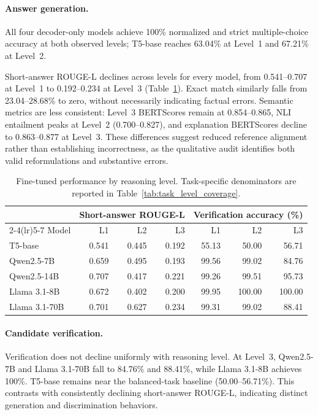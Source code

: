 \documentclass[a4paper,fleqn]{cas-sc}
\begin{document}
\paragraph{Answer generation.}
All four decoder-only models achieve 100\% normalized and strict multiple-choice accuracy at both observed levels; T5-base reaches 63.04\% at Level~1 and 67.21\% at Level~2.

Short-answer ROUGE-L declines across levels for every model, from 0.541--0.707 at Level~1 to 0.192--0.234 at Level~3 (Table~\ref{tab:task_level_performance}). Exact match similarly falls from 23.04--28.68\% to zero, without necessarily indicating factual errors. Semantic metrics are less consistent: Level~3 BERTScores remain at 0.854--0.865, NLI entailment peaks at Level~2 (0.700--0.827), and explanation BERTScores decline to 0.863--0.877 at Level~3. These differences suggest reduced reference alignment rather than establishing incorrectness, as the qualitative audit identifies both valid reformulations and substantive errors.

\begin{table}[htbp]
\centering
\small
\setlength{\tabcolsep}{5pt}
\caption{Fine-tuned performance by reasoning level. Task-specific denominators are reported in Table~\ref{tab:task_level_coverage}.}
\label{tab:task_level_performance}
\begin{tabular}{lrrrrrr}
\toprule
 & \multicolumn{3}{c}{Short-answer ROUGE-L} & \multicolumn{3}{c}{Verification accuracy (\%)} \\
\cmidrule(lr){2-4}\cmidrule(lr){5-7}
Model & L1 & L2 & L3 & L1 & L2 & L3 \\
\midrule
T5-base & 0.541 & 0.445 & 0.192 & 55.13 & 50.00 & 56.71 \\
Qwen2.5-7B & 0.659 & 0.495 & 0.193 & 99.56 & 99.02 & 84.76 \\
Qwen2.5-14B & 0.707 & 0.417 & 0.221 & 99.26 & 99.51 & 95.73 \\
Llama 3.1-8B & 0.672 & 0.402 & 0.200 & 99.95 & 100.00 & 100.00 \\
Llama 3.1-70B & 0.701 & 0.627 & 0.234 & 99.31 & 99.02 & 88.41 \\
\bottomrule
\end{tabular}
\end{table}

\paragraph{Candidate verification.}
Verification does not decline uniformly with reasoning level. At Level~3, Qwen2.5-7B and Llama 3.1-70B fall to 84.76\% and 88.41\%, while Llama 3.1-8B achieves 100\%. T5-base remains near the balanced-task baseline (50.00--56.71\%). This contrasts with consistently declining short-answer ROUGE-L, indicating distinct generation and discrimination behaviors.
\end{document}
